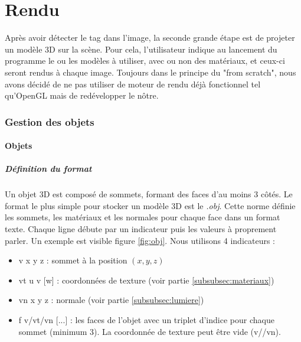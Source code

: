 \part{Rendu}
    Après avoir détecter le tag dans l'image, la seconde grande étape est de projeter un modèle 3D sur la scène. Pour cela, l'utilisateur indique au lancement du programme le ou les modèles à utiliser, avec ou non des matériaux, et ceux-ci seront rendus à chaque image. Toujours dans le principe du "from scratch", nous avons décidé de ne pas utiliser de moteur de rendu déjà fonctionnel tel qu'OpenGL mais de redévelopper le nôtre.

    \section{Gestion des objets}

        \subsection{Objets}

            \subsubsection{Définition du format}                
                Un objet 3D est composé de sommets, formant des faces d'au moins 3 côtés. Le format le plus simple pour stocker un modèle 3D est le \emph{.obj}. Cette norme définie les sommets, les matériaux et les normales pour chaque face dans un format texte. Chaque ligne débute par un indicateur puis les valeurs à proprement parler. Un exemple est visible figure \ref{fig:obj}. Nous utilisons 4 indicateurs :
                \begin{itemize}
                    \item v x y z : sommet à la position $(x, y, z)$
                    \item vt u v [w] : coordonnées de texture (voir partie \ref{subsubsec:materiaux})
                    \item vn x y z : normale (voir partie \ref{subsubsec:lumiere})
                    \item f v/vt/vn [...] : les faces de l'objet avec un triplet d'indice pour chaque sommet (minimum 3). La coordonnée de texture peut être vide (v//vn).
                \end{itemize}
                
